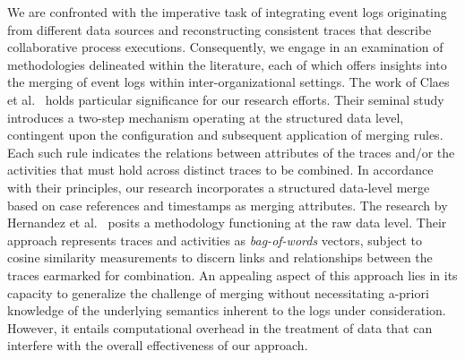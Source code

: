 We are confronted with the imperative task of integrating event logs originating from different data sources and reconstructing %
consistent traces that describe collaborative process executions.
Consequently, we engage in an examination of %
methodologies delineated within the literature, each of which offers insights into the merging of event logs within inter-organizational settings.
The work of Claes et al.~\citep{claes2014merging} holds particular significance for our research efforts. Their seminal study introduces a two-step mechanism operating at the structured data level, contingent upon the configuration and subsequent application of merging rules. Each such rule indicates %
the relations between attributes of the traces and/or the activities that must hold across %
distinct traces %
to be combined. %
In accordance with their principles, our research incorporates a structured data-level merge based on case references and timestamps as merging attributes. The research by Hernandez et al.~\citep{hernandez2021merging} posits a methodology functioning at the raw data level. Their approach represents traces and activities as \textit{bag-of-words} vectors, subject to cosine similarity measurements to discern links and relationships between the traces earmarked for combination. An appealing aspect of this approach lies in its capacity to generalize the challenge of merging without necessitating a-priori knowledge of the underlying semantics inherent to the logs under consideration. However, it entails computational overhead in the treatment of data that can interfere with the overall effectiveness of our approach. %





